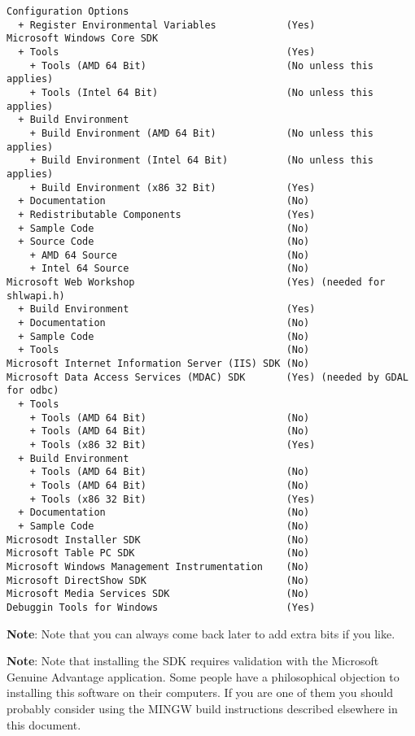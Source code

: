 \begin{verbatim}
Configuration Options
  + Register Environmental Variables            (Yes)
Microsoft Windows Core SDK
  + Tools                                       (Yes)
    + Tools (AMD 64 Bit)                        (No unless this applies)
    + Tools (Intel 64 Bit)                      (No unless this applies)
  + Build Environment
    + Build Environment (AMD 64 Bit)            (No unless this applies)
    + Build Environment (Intel 64 Bit)          (No unless this applies)
    + Build Environment (x86 32 Bit)            (Yes)
  + Documentation                               (No)
  + Redistributable Components                  (Yes)
  + Sample Code                                 (No)
  + Source Code                                 (No)
    + AMD 64 Source                             (No)
    + Intel 64 Source                           (No)
Microsoft Web Workshop                          (Yes) (needed for shlwapi.h)
  + Build Environment                           (Yes)
  + Documentation                               (No)
  + Sample Code                                 (No)
  + Tools                                       (No)
Microsoft Internet Information Server (IIS) SDK (No)
Microsoft Data Access Services (MDAC) SDK       (Yes) (needed by GDAL for odbc)
  + Tools
    + Tools (AMD 64 Bit)                        (No)
    + Tools (AMD 64 Bit)                        (No)
    + Tools (x86 32 Bit)                        (Yes)
  + Build Environment
    + Tools (AMD 64 Bit)                        (No)
    + Tools (AMD 64 Bit)                        (No)
    + Tools (x86 32 Bit)                        (Yes)
  + Documentation                               (No)
  + Sample Code                                 (No)
Microsodt Installer SDK                         (No)
Microsoft Table PC SDK                          (No)
Microsoft Windows Management Instrumentation    (No)
Microsoft DirectShow SDK                        (No)
Microsoft Media Services SDK                    (No)
Debuggin Tools for Windows                      (Yes)
\end{verbatim}

\textbf{Note}:   Note that you can always come back later to add extra bits if you like.

\textbf{Note}:   Note that installing the SDK requires validation with the 
Microsoft Genuine Advantage application. Some people have a philosophical 
objection to installing this software on their computers. If you are one 
of them you should probably consider using the MINGW build instructions 
described elsewhere in this document.


